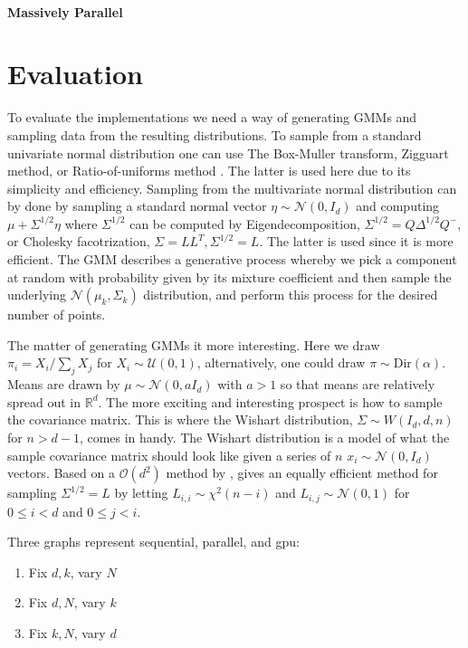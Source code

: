 \documentclass{article}
\newcommand{\boundedBy}[1]{\mathcal{O} \left ( #1 \right )}
\begin{document}
\paragraph{Massively Parallel}

\section{Evaluation}

To evaluate the implementations we need a way of generating GMMs and sampling data from the resulting distributions. To sample from a standard univariate normal distribution one can use The Box-Muller transform, Zigguart method, or Ratio-of-uniforms method \cite{kinderman1977computer}. The latter is used here due to its simplicity and efficiency. Sampling from the multivariate normal distribution can by done by sampling a standard normal vector $\eta \sim \mathcal{N}(0 ,I_d)$ and computing $\mu + \Sigma^{1/2} \eta$ where $\Sigma^{1/2}$ can be computed by Eigendecomposition, $\Sigma^{1/2} = Q \Delta^{1/2} Q^{-}$, or Cholesky facotrization, $\Sigma = L L^T, \Sigma^{1/2} = L$. The latter is used since it is more efficient. The GMM describes a generative process whereby we pick a component at random with probability given by its mixture coefficient and then sample the underlying $\mathcal{N}(\mu_k, \Sigma_k)$ distribution, and perform this process for the desired number of points.

The matter of generating GMMs it more interesting. Here we draw $\pi_i = X_i / \sum_{j} X_j$ for $X_i \sim \mathcal{U}(0, 1)$, alternatively, one could draw $\pi \sim \text{Dir}(\alpha)$. Means are drawn by $\mu \sim \mathcal{N}(0, a I_d)$ with $a > 1$ so that means are relatively spread out in $\mathbb{R}^{d}$. The more exciting and interesting prospect is how to sample the covariance matrix. This is where the Wishart distribution, $\Sigma \sim W(I_d, d, n)$ for $n > d - 1$, comes in handy. The Wishart distribution is a model of what the sample covariance matrix should look like given a series of $n$ $x_i \sim \mathcal{N}(0, I_d)$ vectors. Based on a $\boundedBy{d^2}$ method by \cite{odell1966numerical}, \cite{sawyer2007wishart} gives an equally efficient method for sampling $\Sigma^{1/2} = L$ by letting $L_{i,i} \sim \chi^2(n - i)$ and $L_{i,j} \sim \mathcal{N}(0, 1)$ for $0 \le i < d$ and $0 \le j < i$. 

Three graphs represent sequential, parallel, and gpu:

\begin{enumerate}
	\item Fix $d, k$, vary $N$
	\item Fix $d, N$, vary $k$
	\item Fix $k, N$, vary $d$
\end{enumerate}
\end{document}
